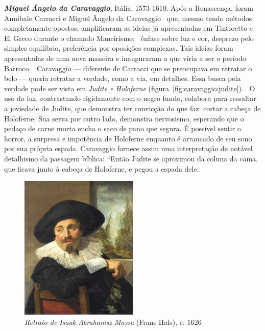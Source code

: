 \textbf{\emph{Miguel Ângelo da Caravaggio}}, Itália, 1573-1610.  Após
a Renascença, foram Annibale Carracci e Miguel Ângelo da
Caravaggio~\cite{bayer} que, mesmo tendo métodos completamente
opostos, amplificaram as ideias já apresentadas em Tintoretto e El
Greco durante o chamado Maneirismo:~\cite{tatarkiewicz} ênfase sobre
luz e cor, desprezo pelo simples equilíbrio, preferência por oposições
complexas. Tais ideias foram apresentadas de uma nova maneira e
inauguraram o que viria a ser o período
Barroco.~\cite{hills} Caravaggio --- diferente de Carracci que se
preocupava em retratar o belo --- queria retratar a verdade, como a
via, em detalhes. Essa busca pela verdade pode ser vista em
\emph{Judite e Holoferne}
(figura~\ref{fig:caravaggio:judite}).~\cite{puglisi,caravaggio} O uso
da luz, contrastando rigidamente com o negro fundo, colabora para
ressaltar a joviedade de Judite, que demonstra ter convicção do que
faz: cortar a cabeça de Holoferne. Sua serva por outro lado, demonstra
nervosismo, esperando que o pedaço de carne morta encha o saco de pano
que segura. É possível sentir o horror, a surpresa e impotência de
Holoferne enquanto é arrancado de seu sono por sua própria
espada. Caravaggio fornece assim uma interpretação de notável
detalhismo da passagem bíblica: ``Então Judite se aproximou da coluna
da cama, que ficava junto à cabeça de Holoferne, e pegou a espada
dele.
\begin{figure}
  \vspace{-15pt}
  \begin{centering}
    \caption{\emph{Retrato de Isaak Abrahamsz Massa} (Frans Hals), c. 1626}
    \label{fig:hals:massa}
    \includegraphics[width=0.5\textwidth]{figs/hals_massa.png}
  \end{centering}
\end{figure}

